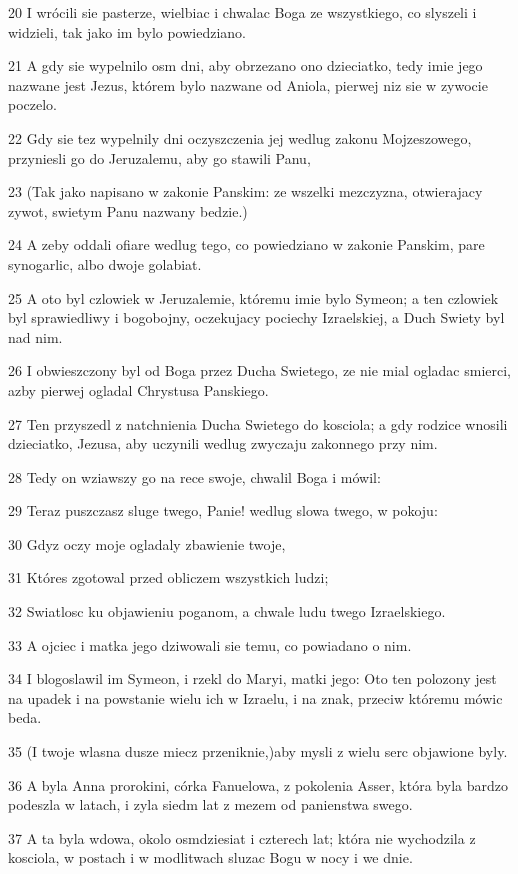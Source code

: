 \par 20 I wrócili sie pasterze, wielbiac i chwalac Boga ze wszystkiego, co slyszeli i widzieli, tak jako im bylo powiedziano.
\par 21 A gdy sie wypelnilo osm dni, aby obrzezano ono dzieciatko, tedy imie jego nazwane jest Jezus, którem bylo nazwane od Aniola, pierwej niz sie w zywocie poczelo.
\par 22 Gdy sie tez wypelnily dni oczyszczenia jej wedlug zakonu Mojzeszowego, przyniesli go do Jeruzalemu, aby go stawili Panu,
\par 23 (Tak jako napisano w zakonie Panskim: ze wszelki mezczyzna, otwierajacy zywot, swietym Panu nazwany bedzie.)
\par 24 A zeby oddali ofiare wedlug tego, co powiedziano w zakonie Panskim, pare synogarlic, albo dwoje golabiat.
\par 25 A oto byl czlowiek w Jeruzalemie, któremu imie bylo Symeon; a ten czlowiek byl sprawiedliwy i bogobojny, oczekujacy pociechy Izraelskiej, a Duch Swiety byl nad nim.
\par 26 I obwieszczony byl od Boga przez Ducha Swietego, ze nie mial ogladac smierci, azby pierwej ogladal Chrystusa Panskiego.
\par 27 Ten przyszedl z natchnienia Ducha Swietego do kosciola; a gdy rodzice wnosili dzieciatko, Jezusa, aby uczynili wedlug zwyczaju zakonnego przy nim.
\par 28 Tedy on wziawszy go na rece swoje, chwalil Boga i mówil:
\par 29 Teraz puszczasz sluge twego, Panie! wedlug slowa twego, w pokoju:
\par 30 Gdyz oczy moje ogladaly zbawienie twoje,
\par 31 Któres zgotowal przed obliczem wszystkich ludzi;
\par 32 Swiatlosc ku objawieniu poganom, a chwale ludu twego Izraelskiego.
\par 33 A ojciec i matka jego dziwowali sie temu, co powiadano o nim.
\par 34 I blogoslawil im Symeon, i rzekl do Maryi, matki jego: Oto ten polozony jest na upadek i na powstanie wielu ich w Izraelu, i na znak, przeciw któremu mówic beda.
\par 35 (I twoje wlasna dusze miecz przeniknie,)aby mysli z wielu serc objawione byly.
\par 36 A byla Anna prorokini, córka Fanuelowa, z pokolenia Asser, która byla bardzo podeszla w latach, i zyla siedm lat z mezem od panienstwa swego.
\par 37 A ta byla wdowa, okolo osmdziesiat i czterech lat; która nie wychodzila z kosciola, w postach i w modlitwach sluzac Bogu w nocy i we dnie.
